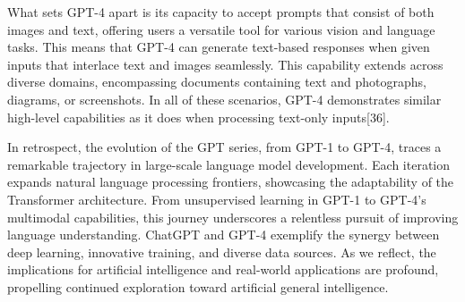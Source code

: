 \documentclass[fleqn,10pt]{thescipub} %
\begin{document}
What sets GPT-4 apart is its capacity to accept prompts that consist of both images and text, offering users a versatile tool for various vision and language tasks. This means that GPT-4 can generate text-based responses when given inputs that interlace text and images seamlessly. This capability extends across diverse domains, encompassing documents containing text and photographs, diagrams, or screenshots. In all of these scenarios, GPT-4 demonstrates similar high-level capabilities as it does when processing text-only inputs[36].

In retrospect, the evolution of the GPT series, from GPT-1 to GPT-4, traces a remarkable trajectory in large-scale language model development. Each iteration expands natural language processing frontiers, showcasing the adaptability of the Transformer architecture. From unsupervised learning in GPT-1 to GPT-4's multimodal capabilities, this journey underscores a relentless pursuit of improving language understanding. ChatGPT and GPT-4 exemplify the synergy between deep learning, innovative training, and diverse data sources. As we reflect, the implications for artificial intelligence and real-world applications are profound, propelling continued exploration toward artificial general intelligence.
\end{document}
